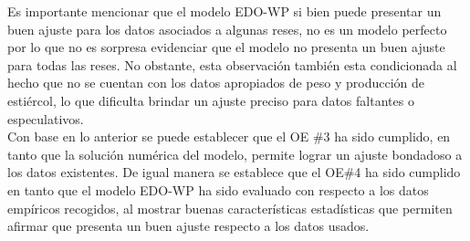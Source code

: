 Es importante mencionar que el modelo EDO-WP si bien puede presentar un buen ajuste para los datos asociados a algunas reses, no es un modelo perfecto por lo que no es sorpresa evidenciar que el modelo no presenta un buen ajuste para todas las reses. No obstante, esta observación también esta condicionada al hecho que no se cuentan con los datos apropiados de peso y producción de estiércol, lo que dificulta brindar un ajuste preciso para datos faltantes o especulativos.\\

Con base en lo anterior se puede establecer que el OE \#3 ha sido cumplido, en tanto que la solución numérica del modelo, permite lograr un ajuste bondadoso a los datos existentes. De igual manera se establece que el OE\#4 ha sido cumplido en tanto que el modelo EDO-WP ha sido evaluado con respecto a los datos empíricos recogidos, al mostrar buenas características estadísticas que permiten afirmar que presenta un buen ajuste respecto a los datos usados.

\pagebreak

